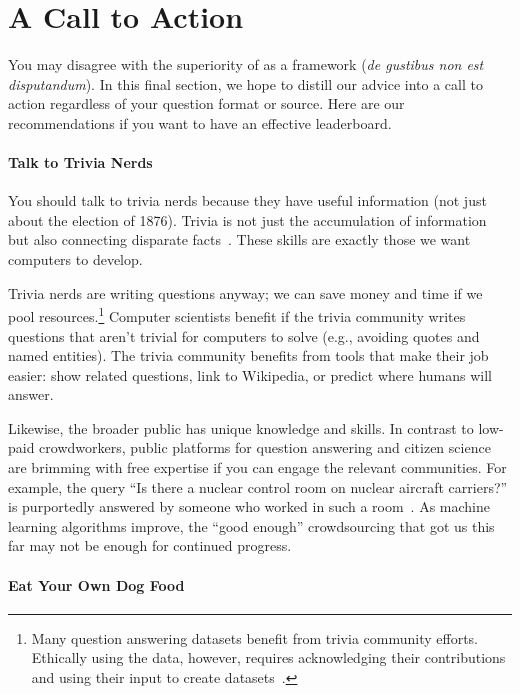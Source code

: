 

\section{A Call to Action}
\label{sec:call}


You may disagree with the superiority of \qb{} as a \qa{} framework (\textit{de gustibus non est disputandum}).
In this final section, we hope to distill our advice into a call to action regardless of your question format or source.
Here are our recommendations if you want to have an effective leaderboard.

\paragraph{Talk to Trivia Nerds}

You should talk to trivia nerds because they have useful information (not just about the election of 1876).
Trivia is not just the accumulation of information but also connecting disparate facts~\cite{jennings-06}.
These skills are exactly those we want computers to develop.

Trivia nerds are writing questions anyway; we can save money and time
if we pool resources.\footnote{Many question answering datasets
  benefit from trivia community efforts.
Ethically using the data, however, requires acknowledging their
contributions and using their input to create datasets~\cite[Consent
  and Inclusivity]{jo-20}.}
Computer scientists benefit if the trivia community writes questions
that aren't trivial for computers to solve (e.g., avoiding quotes and
named entities).
The trivia community benefits from tools that make their job easier:
show related questions, link to Wikipedia, or predict where humans
will answer.

Likewise, the broader public has unique knowledge and skills.
In contrast to low-paid crowdworkers, public platforms for question
answering and citizen science~\cite{bowser-13} are brimming with free
expertise if you can engage the relevant communities.
For example, the  query ``Is there a nuclear control room
on nuclear aircraft carriers?'' is purportedly answered by someone who
worked in such a room~\cite{humphries-17}.
As machine learning algorithms improve, the ``good enough''
crowdsourcing that got us this far may not be enough for
continued progress.

\paragraph{Eat Your Own Dog Food}

